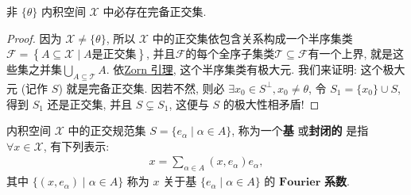 \documentclass[../../main.tex]{subfiles}%
\begin{document}
\begin{proposition}
非 $\{\theta\}$ 内积空间 $\mathscr{X}$ 中必存在完备正交集.
\end{proposition}
\begin{proof}

因为 $\mathscr{X}\neq\{\theta\}$, 所以 $\mathscr{X}$ 中的正交集依包含关系构成一个半序集类$\mathcal{F} =\left\{ A\subseteq \mathscr{X} \mid A\text{是正交集} \right\} $, 并且$\mathcal{F}$的每个全序子集类$\mathcal{T} \subseteq \mathcal{F}$有一个上界, 就是这些集之并集$\bigcup_{A\subseteq \mathcal{T}}{A}$. 依\hyperref[lemma:泛函分析--Zorn引理]{Zorn 引理}, 这个半序集类有极大元. 我们来证明: 这个极大元 (记作 $S$) 就是完备正交集. 因若不然, 则必 $\exists x_0\in S^\perp,x_0\neq\theta$, 令 $S_1=\{x_0\}\cup S$, 得到 $S_1$ 还是正交集, 并且 $S\subsetneq S_1$, 这便与 $S$ 的极大性相矛盾!

\end{proof}

\begin{definition}
内积空间 $\mathscr{X}$ 中的正交规范集 $S=\{e_\alpha\mid\alpha\in A\}$, 称为一个\textbf{基} 或\textbf{封闭的} 是指 $\forall x\in\mathscr{X}$, 有下列表示:
\begin{align*}
x=\sum\limits_{\alpha\in A}(x,e_\alpha)e_\alpha,
\end{align*}
其中 $\{(x,e_\alpha)\mid\alpha\in A\}$ 称为 $x$ 关于基 $\{e_\alpha\mid\alpha\in A\}$ 的 $\mathbf{Fourier}$ \textbf{系数}.
\end{definition}
\end{document}
